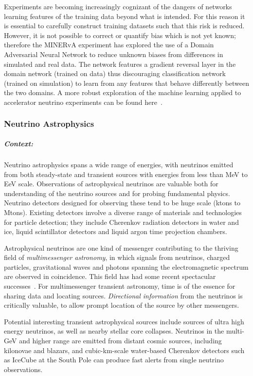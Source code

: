 Experiments are becoming increasingly cognizant of the dangers of networks learning features of the training data beyond what is intended. For this reason it is essential to carefully construct training datasets such that this risk is reduced. However, it is not possible to correct or quantify bias which is not yet known; therefore the MINERvA experiment has explored the use of a Domain Adversarial Neural Network\cite{Perdue_2018} to reduce unknown biases from differences in simulated and real data. The network features a gradient reversal layer in the domain network (trained on data) thus  discouraging classification network (trained on simulation) to learn from any features that behave differently between the two domains. A more robust exploration of the machine learning applied to accelerator neutrino experiments can be found here~\cite{Psihas_2020}.

\subsubsection{Neutrino Astrophysics} \label{sec:nu_astro}

\subparagraph*{Context:} Neutrino astrophysics spans a wide range of energies, with neutrinos emitted from both steady-state and transient sources with energies from less than MeV to EeV scale.  Observations of astrophysical neutrinos are valuable both for understanding of the neutrino sources and for probing fundamental physics.  Neutrino detectors designed for observing these tend to be huge scale (ktons to Mtons).  Existing detectors involve a diverse range of materials and technologies for particle detection; they include Cherenkov radiation detectors in water and ice, liquid scintillator detectors and liquid argon time projection chambers.
  
Astrophysical neutrinos are one kind of messenger contributing to the thriving field of \textit{multimessenger astronomy}, in which signals from neutrinos, charged particles, gravitational waves and photons spanning the electromagnetic spectrum are observed in coincidence.  This field has had some recent spectacular successes~\cite{Abbott_2017,AaAc2018,GrFo2020}.  For multimessenger transient astronomy, time is of the essence for sharing data and locating sources.  \textit{Directional information} from the neutrinos is critically valuable, to allow prompt location of the source by other messengers.

Potential interesting transient astrophysical sources include sources of ultra high energy neutrinos, as well as nearby stellar core collapses.   Neutrinos in the multi-GeV and higher range are emitted from distant cosmic sources, including kilonovae and blazars, and cubic-km-scale water-based Cherenkov detectors such as IceCube at the South Pole can produce fast alerts from  single neutrino observations.

